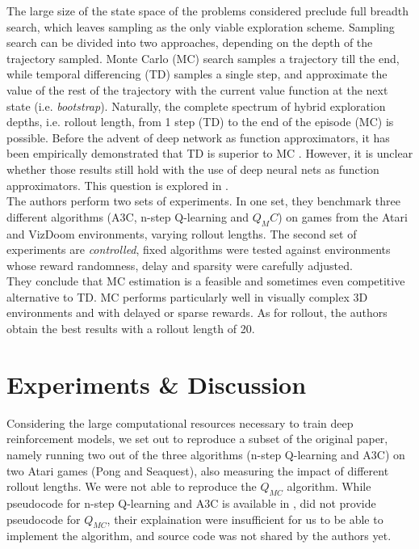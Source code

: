 \documentclass{article}
\begin{document}
The large size of the state space of the problems considered preclude full breadth
search, which leaves sampling as the only viable exploration scheme. Sampling
search can be divided into two approaches, depending on the depth of the trajectory
sampled. Monte Carlo (MC) search samples a trajectory till the end, while temporal
differencing (TD) samples a single step, and approximate the value of the rest of the
trajectory with the current value function at the next state (i.e. \emph{bootstrap}).
Naturally, the complete spectrum of hybrid exploration depths, i.e. rollout length,
from 1 step (TD) to the end of the episode (MC) is possible.
Before the advent of deep network as function approximators, it has been empirically
demonstrated that TD is superior to MC \citep{sutton1995}. However, it is unclear
whether those results still hold with the use of deep neural nets as function approximators.
This question is explored in \citep{amiranashvili2018analyzing}. \\

The authors perform two sets of experiments. In one set, they benchmark three different
algorithms (A3C, n-step Q-learning and $Q_MC$) on games from the Atari and VizDoom environments,
varying rollout lengths. The second set of experiments are \emph{controlled}, fixed algorithms
were tested against environments whose reward randomness, delay and sparsity were
carefully adjusted.\\

They conclude that MC estimation is a feasible and sometimes even competitive alternative
to TD. MC performs particularly well in visually complex 3D environments
and with delayed or sparse rewards. As for rollout, the authors obtain the
best results with a rollout length of 20.

\section{Experiments \& Discussion}

Considering the large computational resources necessary to train deep reinforcement models,
we set out to reproduce a subset of the original paper, namely running two out of the three
algorithms (n-step Q-learning and A3C) on two Atari games (Pong and Seaquest),
also measuring the impact of different rollout lengths. We were not able to reproduce
the $Q_{MC}$ algorithm. While pseudocode for n-step Q-learning and A3C is available in
\cite{pmlr-v48-mniha16}, \cite{amiranashvili2018analyzing} did not provide pseudocode
for $Q_{MC}$, their explaination were insufficient for us to be able to implement the
algorithm, and source code was not shared by the authors yet. \\
\end{document}
